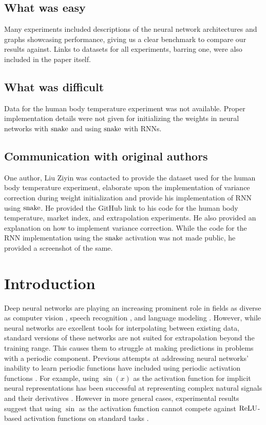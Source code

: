 \subsection*{What was easy}

Many experiments included descriptions of the neural network architectures and graphs showcasing performance, giving us a clear benchmark to compare our results against. Links to datasets for all experiments, barring one, were also included in the paper itself.

\subsection*{What was difficult}

Data for the human body temperature experiment was not available. Proper implementation details were not given for initializing the weights in neural networks with \( \operatorname{snake} \) and using \( \operatorname{snake} \) with RNNs.

\subsection*{Communication with original authors}

One author, Liu Ziyin was contacted to provide the dataset used for the human body temperature experiment, elaborate upon the implementation of variance correction during weight initialization and provide his implementation of RNN using \(  \operatorname{snake} \). He provided the GitHub link to his code for the human body temperature, market index, and extrapolation experiments. He also provided an explanation on how to implement variance correction. While the code for the RNN implementation using the \(  \operatorname{snake} \) activation was not made public, he provided a screenshot of the same.

\section{Introduction}

Deep neural networks are playing an increasing prominent role in fields as diverse as computer vision \cite{10.1007/978-3-030-11024-6_1}, speech recognition \cite{deng_2016}, and language modeling \cite{melis2017state}. However, while neural networks are excellent tools for interpolating between existing data, standard versions of these networks are not suited for extrapolation beyond the training range. This causes them to struggle at making predictions in problems with a periodic component. Previous attempts at addressing neural networks' inability to learn periodic functions have included using periodic activation functions \cite{fourier_one, zhumekenov2019fourier}. For example, using $\sin(x)$ as the activation function for implicit neural representations has been successful at representing complex natural signals and their derivatives \cite{sitzmann2020implicit}. However in more general cases, experimental results suggest that using $\sin$ as the activation function cannot compete against $ \operatorname{ReLU} $-based activation functions \cite{Ramachandran2017SwishAS, DBLP:conf/icml/NairH10, clevert2016fast, xu2015empirical} on standard tasks \cite{Parascandolo2017TamingTW}. \\

